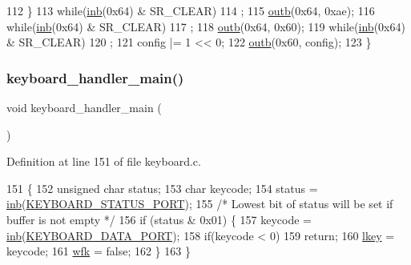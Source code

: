 \begin{DoxyCode}
112     \}
113     \textcolor{keywordflow}{while}(\hyperlink{a00158_a0223c8898dfec29069879dc51076e28a_a0223c8898dfec29069879dc51076e28a}{inb}(0x64) & SR\_CLEAR)
114         ;
115     \hyperlink{a00158_aa37f5841c54156a4b14fc0d6f626b44f_aa37f5841c54156a4b14fc0d6f626b44f}{outb}(0x64, 0xae);
116     \textcolor{keywordflow}{while}(\hyperlink{a00158_a0223c8898dfec29069879dc51076e28a_a0223c8898dfec29069879dc51076e28a}{inb}(0x64) & SR\_CLEAR)
117         ;
118     \hyperlink{a00158_aa37f5841c54156a4b14fc0d6f626b44f_aa37f5841c54156a4b14fc0d6f626b44f}{outb}(0x64, 0x60);
119     \textcolor{keywordflow}{while}(\hyperlink{a00158_a0223c8898dfec29069879dc51076e28a_a0223c8898dfec29069879dc51076e28a}{inb}(0x64) & SR\_CLEAR)
120         ;
121     config |= 1 << 0;
122     \hyperlink{a00158_aa37f5841c54156a4b14fc0d6f626b44f_aa37f5841c54156a4b14fc0d6f626b44f}{outb}(0x60, config);
123 \}
\end{DoxyCode}
\mbox{\label{a00041_adffe6abc4a32b3b10985ec9324bce2af_adffe6abc4a32b3b10985ec9324bce2af}} 
\subsubsection{\texorpdfstring{keyboard\+\_\+handler\+\_\+main()}{keyboard\_handler\_main()}}
{\footnotesize\ttfamily void keyboard\+\_\+handler\+\_\+main (\begin{DoxyParamCaption}{ }\end{DoxyParamCaption})}



Definition at line 151 of file keyboard.\+c.


\begin{DoxyCode}
151                                  \{
152     \textcolor{keywordtype}{unsigned} \textcolor{keywordtype}{char} status;
153     \textcolor{keywordtype}{char} keycode;
154     status = \hyperlink{a00158_a0223c8898dfec29069879dc51076e28a_a0223c8898dfec29069879dc51076e28a}{inb}(\hyperlink{a00041_ab79ca089665bc7f5cc151883d1bc69ed_ab79ca089665bc7f5cc151883d1bc69ed}{KEYBOARD\_STATUS\_PORT});
155     \textcolor{comment}{/* Lowest bit of status will be set if buffer is not empty */}
156     \textcolor{keywordflow}{if} (status & 0x01) \{
157         keycode = \hyperlink{a00158_a0223c8898dfec29069879dc51076e28a_a0223c8898dfec29069879dc51076e28a}{inb}(\hyperlink{a00041_a49e0a04e81098085d2948c1e9f8c99cb_a49e0a04e81098085d2948c1e9f8c99cb}{KEYBOARD\_DATA\_PORT});
158         \textcolor{keywordflow}{if}(keycode < 0)
159             \textcolor{keywordflow}{return};
160         \hyperlink{a00038_ade374650022cb30c4f5591a8dafad685_ade374650022cb30c4f5591a8dafad685}{lkey} = keycode;
161         \hyperlink{a00038_a6ddd5223379778858edc46ffbec19775_a6ddd5223379778858edc46ffbec19775}{wfk} = \textcolor{keyword}{false};
162     \}
163 \}
\end{DoxyCode}
